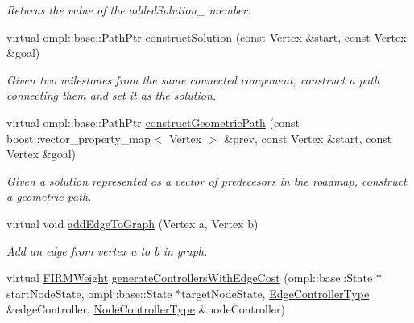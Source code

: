 \begin{DoxyCompactItemize}
\begin{DoxyCompactList}\small\item\em \-Returns the value of the added\-Solution\-\_\- member. \end{DoxyCompactList}\item 
\hypertarget{class_f_i_r_m_a780c6849089ac155758c7d74a1114d1b}{virtual ompl\-::base\-::\-Path\-Ptr \hyperlink{class_f_i_r_m_a780c6849089ac155758c7d74a1114d1b}{construct\-Solution} (const \-Vertex \&start, const \-Vertex \&goal)}\label{class_f_i_r_m_a780c6849089ac155758c7d74a1114d1b}

\begin{DoxyCompactList}\small\item\em \-Given two milestones from the same connected component, construct a path connecting them and set it as the solution. \end{DoxyCompactList}\item 
\hypertarget{class_f_i_r_m_a1da2ab71468c89f8d640df882eb97d36}{virtual ompl\-::base\-::\-Path\-Ptr \hyperlink{class_f_i_r_m_a1da2ab71468c89f8d640df882eb97d36}{construct\-Geometric\-Path} (const boost\-::vector\-\_\-property\-\_\-map$<$ \-Vertex $>$ \&prev, const \-Vertex \&start, const \-Vertex \&goal)}\label{class_f_i_r_m_a1da2ab71468c89f8d640df882eb97d36}

\begin{DoxyCompactList}\small\item\em \-Given a solution represented as a vector of predecesors in the roadmap, construct a geometric path. \end{DoxyCompactList}\item 
\hypertarget{class_f_i_r_m_aff9745cc3d4c9419f7e263634b01d97c}{virtual void \hyperlink{class_f_i_r_m_aff9745cc3d4c9419f7e263634b01d97c}{add\-Edge\-To\-Graph} (\-Vertex a, \-Vertex b)}\label{class_f_i_r_m_aff9745cc3d4c9419f7e263634b01d97c}

\begin{DoxyCompactList}\small\item\em \-Add an edge from vertex a to b in graph. \end{DoxyCompactList}\item 
\hypertarget{class_f_i_r_m_acb96d1cd6665cf4da65a41f580932103}{virtual \hyperlink{class_f_i_r_m_weight}{\-F\-I\-R\-M\-Weight} \hyperlink{class_f_i_r_m_acb96d1cd6665cf4da65a41f580932103}{generate\-Controllers\-With\-Edge\-Cost} (ompl\-::base\-::\-State $\ast$start\-Node\-State, ompl\-::base\-::\-State $\ast$target\-Node\-State, \hyperlink{class_f_i_r_m_a70abcb24fbc9f836b94119f65c8f8a37}{\-Edge\-Controller\-Type} \&edge\-Controller, \hyperlink{class_controller}{\-Node\-Controller\-Type} \&node\-Controller)}\label{class_f_i_r_m_acb96d1cd6665cf4da65a41f580932103}


\end{DoxyCompactItemize}
